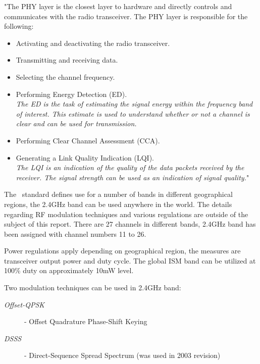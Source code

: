  "The PHY layer is the closest layer to hardware and directly controls
 and communicates with the radio transceiver.
 The PHY layer is responsible for the following:
 \begin{itemize}

        \item Activating and deactivating the radio transceiver.

	\item Transmitting and receiving data.

	\item Selecting the channel frequency.

	\item Performing Energy Detection (ED).\\
	\small{\emph{The ED is the task of estimating the signal energy within the
	frequency band of interest. This estimate is used to understand
	whether or not a channel is clear and can be used for transmission.}}

	\item Performing Clear Channel Assessment (CCA).

	\item Generating a Link Quality Indication (LQI).\\
	\small{\emph{The LQI is an indication of the quality of the data packets
	received by the receiver. The signal strength can be used as
	an indication of signal quality.}}"
	\end{itemize}

 The \WPAN\ standard defines use
 for a number of bands in different geographical regions, the 2.4GHz
 band can be used anywhere in the world.  The details regarding RF
 modulation techniques and various regulations are outside of the
 subject of this report. There are 27 channels in different bands, 
 2.4GHz band has been assigned with channel numbers 11 to 26.

  Power regulations apply depending on geographical region, the
 measures are transceiver output power and duty cycle. The global
 ISM band can be utilized at 100\% duty on approximately 10mW level.

 Two modulation techniques can be used in 2.4GHz band:
 \begin{description}
 \item[\emph{Offset-QPSK}]- Offset Quadrature Phase-Shift Keying
 \cite{links:wiki:qpsk}
 \item[\emph{DSSS}]- Direct-Sequence Spread Spectrum (was used in 2003 revision)
 \cite{links:wiki:dsss}
 \end{description}

